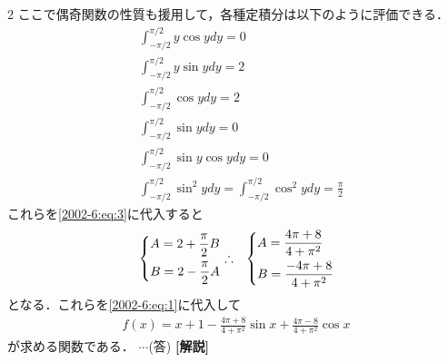 \documentclass[../../../../main.tex]{subfiles}
\begin{document}
\begin{multicols}{2}
    ここで偶奇関数の性質も援用して，各種定積分は以下のように評価できる．
    \begin{align*}
         & \int_{-\pi/2}^{\pi/2} y \cos y dy = 0                                                 \\
         & \int_{-\pi/2}^{\pi/2} y \sin y dy = 2                                                 \\
         & \int_{-\pi/2}^{\pi/2} \cos y dy =  2                                                  \\
         & \int_{-\pi/2}^{\pi/2} \sin y dy = 0                                                   \\
         & \int_{-\pi/2}^{\pi/2} \sin y \cos y dy = 0                                            \\
         & \int_{-\pi/2}^{\pi/2} \sin^2 y dy = \int_{-\pi/2}^{\pi/2} \cos^2 y dy = \frac{\pi}{2}
    \end{align*}
    これらを\cref{2002-6:eq:3}に代入すると
    \begin{align}
         & \begin{dcases}
               A = 2 + \frac{\pi}{2} B \\
               B = 2 - \frac{\pi}{2} A
           \end{dcases}
        \therefore
         & \begin{dcases}
               A = \frac{4\pi+8}{4+\pi^2} \\
               B = \frac{-4\pi+8}{4+\pi^2}
           \end{dcases}
    \end{align}
    となる．これらを\cref{2002-6:eq:1}に代入して
    \begin{align*}
        f(x) = x+1 - \frac{4\pi+8}{4+\pi^2} \sin x + \frac{4\pi-8}{4+\pi^2} \cos x
    \end{align*}
    が求める関数である．    $\cdots$(答)
    {\bf[解説]}

    \newpage
\end{multicols}
\end{document}
